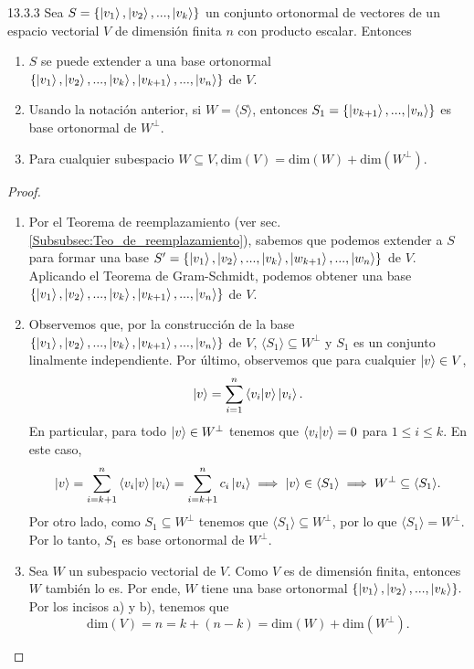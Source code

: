 \documentclass[12pt,libertine]{book}
\begin{document}
\begin{Teo} {13.3.3}
    Sea $S=\{\ket{v_1},\ket{v_2},...,\ket{v_k}\}$ un conjunto ortonormal de vectores de un espacio vectorial $V$ de dimensión finita $n$ con producto escalar. Entonces
    \begin{enumerate}[label=\alph*)]  
    \item $S$ se puede extender a una base ortonormal $\{\ket{v_1},\ket{v_2},...,\ket{v_k},\ket{v_{k+1}},...,\ket{v_n}\}$ de $V$.
    \item Usando la notación anterior, si $W=\langle S \rangle$, entonces $S_1=\{\ket{v_{k+1}},...,\ket{v_n}\}$ es base ortonormal de $W^{\perp}$. 
    \item Para cualquier subespacio $W \subseteq V, \text{dim}(V) = \text{dim}(W) + \text{dim}(W^{\perp}).$
    \end{enumerate}
    \begin{proof}
        \begin{enumerate}[label=\alph*)]
            \item Por el Teorema de reemplazamiento (ver sec. \ref{Subsubsec:Teo_de_reemplazamiento}), sabemos que podemos extender a $S$ para formar una base $S'=\{\ket{v_1},\ket{v_2},...,\ket{v_k},\ket{w_{k+1}},...,\ket{w_n}\}$ de $V$. Aplicando el Teorema de Gram-Schmidt, podemos obtener una base $\{\ket{v_1},\ket{v_2},...,\ket{v_k},\ket{v_{k+1}},...,\ket{v_n}\}$ de $V$.
            \item Observemos que, por la construcción de la base $\{\ket{v_1},\ket{v_2},...,\ket{v_k},\ket{v_{k+1}},...,\ket{v_n}\}$ de $V$, $\langle S_1 \rangle \subseteq W^{\perp}$ y $S_1$ es un conjunto linalmente independiente. Por último, observemos que para cualquier $\ket{v}\in V$, $$\ket{v}=\sum_{i=1}^n \braket{v_i|v}\ket{v_i}.$$ \noindent En particular, para todo $\ket{v}\in W^\perp$ tenemos que $\braket{v_i|v}=0$ para $1\le i\le k$. En este caso, \[
                \ket{v}=\sum_{i=k+1}^n\braket{v_i|v}\ket{v_i}=\sum_{i=k+1}^n c_i\ket{v_i}\implies \ket{v}\in \langle S_1 \rangle \implies W^\perp \subseteq \langle S_1 \rangle .\] \noindent Por otro lado, como $S_1 \subseteq W^\perp$ tenemos que $\langle S_1 \rangle \subseteq W^\perp$, por lo que $\langle S_1 \rangle = W^\perp.$ Por lo tanto, $S_1$ es base ortonormal de $W^\perp$. 
            \item Sea $W$ un subespacio vectorial de $V$. Como $V$ es de dimensión finita, entonces $W$ también lo es. Por ende, $W$ tiene una base ortonormal $\{\ket{v_1},\ket{v_2},...,\ket{v_k}\}.$ Por los incisos a) y b), tenemos que \[
                    \text{dim}(V) = n = k + (n-k) = \text{dim}(W) + \text{dim}(W^\perp).\]  
        \end{enumerate}
    \end{proof}
\end{Teo}
\end{document}
